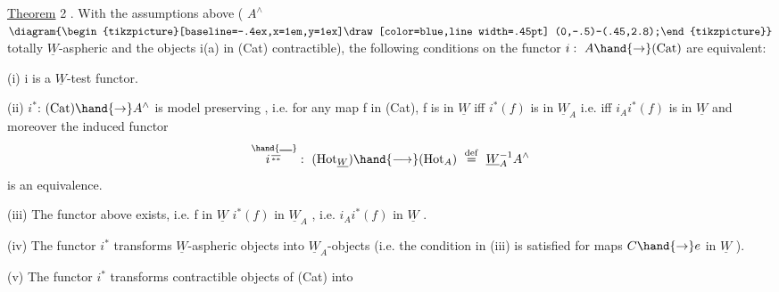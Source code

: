 \uline{Theorem} 2 . With the assumptions above ( $A^\wedge$\ensuremath{\diagram{\begin{tikzpicture}[baseline=-.4ex,x=1em,y=1ex]\draw[color=blue,line width=.45pt] (0,-.5)--(.45,2.8);\end{tikzpicture}}} totally $\underline{W}$-aspheric and the
objects i(a) in (Cat) contractible), the following conditions on the
functor $i:\ A\hand{\to}(\mathrm{Cat})$ are equivalent:

(i) i is a $\underline{W}$-test functor.

(ii) $i^*$: $(\mathrm{Cat})\hand{\to} A^\wedge$ is model preserving , i.e.
for any map f in (Cat), f is in $\underline{W}$ iff $i^*(f)$ is in $\underline{W}_A$ \hand{(}i.e. iff $i_Ai^*(f)$
is in $\underline{W}$ \hand{)}\hand{,} and moreover the induced functor
\[ \overset{\hand{\rule{1em}{.6pt}}}{i^{\over{*}{*}}} :\ (\mathrm{Hot}_{\underline{W}})\hand{\longrightarrow}(\mathrm{Hot}_A) \ \overset{\mathrm{def}}{=}\ \underline{W}_A^{-1}A^\wedge \]
is an equivalence.

(iii) The functor above exists, i.e.  f  in $\underline{W}$  $i^*(f)$ in $\underline{W}_A$ ,
i.e. $i_Ai^*(f)$ in $\underline{W}$ .

(iv) The functor $i^*$ transforms $\underline{W}$-aspheric objects into $\underline{W}_A$-objects
(i.e. the condition in (iii) is satisfied for maps $C\hand{\to} e$ in $\underline{W}$ ).

(v) The functor $i^*$ transforms contractible objects of (Cat) into

